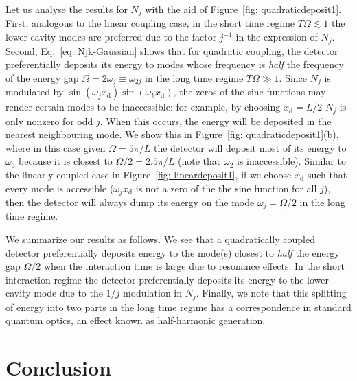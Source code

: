 \documentclass[prd,twocolumn,superscriptaddress,nofootinbib,floatfix,amsmath,amssymb]{revtex4-2}
\begin{document}
    Let us analyse the results for $N_j$ with the aid of Figure~\ref{fig: quadraticdeposit1}. First, analogous to the linear coupling case,  in the short time regime $T\Omega\lesssim 1$ the lower cavity modes are preferred due to the factor $j^{-1}$ in the expression of $N_j$. Second,  Eq.~\eqref{eq: Njk-Gaussian} shows that for quadratic coupling, the detector preferentially deposits its energy to modes whose frequency is \textit{half} the frequency of the energy gap $\Omega=2\omega_j \equiv \omega_{2j}$ in the long time regime $T\Omega\gg 1$. Since $N_j$ is modulated by $\sin(\omega_jx_\text{d})\sin(\omega_k x_\text{d})$, the zeros of the sine functions may render certain modes to be inaccessible: for example, by choosing $x_\text{d}=L/2$ $N_j$ is only nonzero for odd $j$. When this occurs, the energy will be deposited in the nearest neighbouring mode. We show this in Figure~\ref{fig: quadraticdeposit1}(b), where in this case given $\Omega = 5\pi/L$ the detector will deposit most of its energy to $\omega_3$ because it is closest to $\Omega/2 = 2.5\pi/L$ (note that $\omega_2$ is inaccessible). Similar to the linearly coupled case in Figure~\ref{fig: lineardeposit1}, if we choose $x_\text{d}$ such that every mode is accessible ($\omega_jx_{\text{d}}$ is not a zero of the the sine function for all $j$), then the detector will always dump its energy on the mode $\omega_j = \Omega/2$ in the long time regime. 
    
        
    We summarize our results as follows. We see that a quadratically coupled detector preferentially deposits energy to the mode(s) closest to \textit{half} the energy gap $\Omega/2$ when the interaction time is large due to resonance effects. In the short interaction regime the detector preferentially deposits its energy to the lower cavity mode due to the $1/j$ modulation in $N_j$. Finally, we note that this splitting of energy into two parts in the long time regime has a correspondence in standard quantum optics, an effect known as half-harmonic generation.
        
        
        
        
        

        
        
        
    

    \section{Conclusion}
    \label{sec:conclusions}
    
\end{document}
